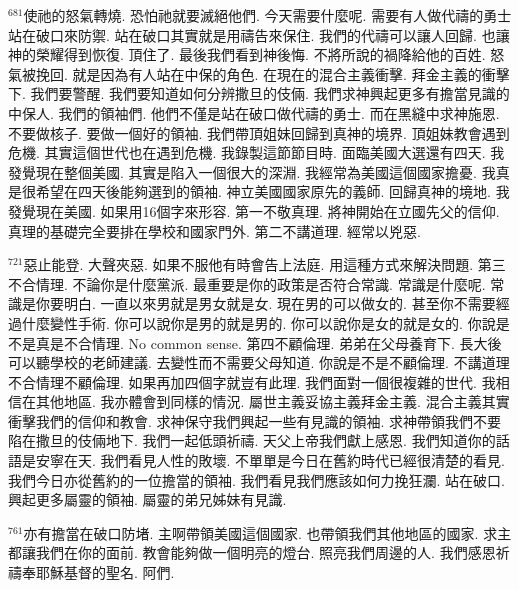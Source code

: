 \documentclass{book}
\begin{document}
$^{681}$使祂的怒氣轉燒.
恐怕祂就要滅絕他們.
今天需要什麼呢.
需要有人做代禱的勇士站在破口來防禦.
站在破口其實就是用禱告來保住.
我們的代禱可以讓人回歸.
也讓神的榮耀得到恢復.
頂住了.
最後我們看到神後悔.
不將所說的禍降給他的百姓.
怒氣被挽回.
就是因為有人站在中保的角色.
在現在的混合主義衝擊.
拜金主義的衝擊下.
我們要警醒.
我們要知道如何分辨撒旦的伎倆.
我們求神興起更多有擔當見識的中保人.
我們的領袖們.
他們不僅是站在破口做代禱的勇士.
而在黑縫中求神施恩.
不要做核子.
要做一個好的領袖.
我們帶頂姐妹回歸到真神的境界.
頂姐妹教會遇到危機.
其實這個世代也在遇到危機.
我錄製這節節目時.
面臨美國大選還有四天.
我發覺現在整個美國.
其實是陷入一個很大的深淵.
我經常為美國這個國家擔憂.
我真是很希望在四天後能夠選到的領袖.
神立美國國家原先的義師.
回歸真神的境地.
我發覺現在美國.
如果用16個字來形容.
第一不敬真理.
將神開始在立國先父的信仰.
真理的基礎完全要排在學校和國家門外.
第二不講道理.
經常以兇惡.

$^{721}$惡止能登.
大聲夾惡.
如果不服他有時會告上法庭.
用這種方式來解決問題.
第三不合情理.
不論你是什麼黨派.
最重要是你的政策是否符合常識.
常識是什麼呢.
常識是你要明白.
一直以來男就是男女就是女.
現在男的可以做女的.
甚至你不需要經過什麼變性手術.
你可以說你是男的就是男的.
你可以說你是女的就是女的.
你說是不是真是不合情理.
No common sense.
第四不顧倫理.
弟弟在父母養育下.
長大後可以聽學校的老師建議.
去變性而不需要父母知道.
你說是不是不顧倫理.
不講道理不合情理不顧倫理.
如果再加四個字就豈有此理.
我們面對一個很複雜的世代.
我相信在其他地區.
我亦體會到同樣的情況.
屬世主義妥協主義拜金主義.
混合主義其實衝擊我們的信仰和教會.
求神保守我們興起一些有見識的領袖.
求神帶領我們不要陷在撒旦的伎倆地下.
我們一起低頭祈禱.
天父上帝我們獻上感恩.
我們知道你的話語是安寧在天.
我們看見人性的敗壞.
不單單是今日在舊約時代已經很清楚的看見.
我們今日亦從舊約的一位擔當的領袖.
我們看見我們應該如何力挽狂瀾.
站在破口.
興起更多屬靈的領袖.
屬靈的弟兄姊妹有見識.

$^{761}$亦有擔當在破口防堵.
主啊帶領美國這個國家.
也帶領我們其他地區的國家.
求主都讓我們在你的面前.
教會能夠做一個明亮的燈台.
照亮我們周邊的人.
我們感恩祈禱奉耶穌基督的聖名.
阿們.
\newpage
\end{document}
